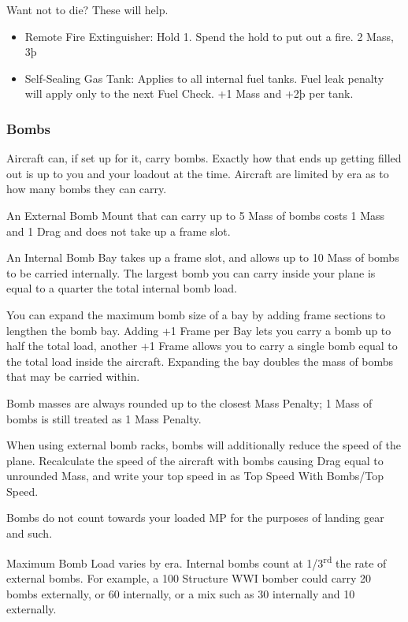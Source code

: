 \documentclass{article}
\begin{document}
Want not to die? These will help.

\begin{itemize}
    \item          Remote Fire Extinguisher: Hold 1. Spend the hold to put out a
          fire. 2 Mass, 3þ
    \item          Self-Sealing Gas Tank: Applies to all internal fuel tanks. Fuel
          leak penalty will apply only to the next Fuel Check. +1 Mass and +2þ
          per tank.
\end{itemize}

\subsubsection{Bombs}
\label{_Bombs}

Aircraft can, if set up for it, carry bombs. Exactly how that ends up
getting filled out is up to you and your loadout at the time. Aircraft
are limited by era as to how many bombs they can carry.

An External Bomb Mount that can carry up to 5 Mass of bombs costs 1 Mass
and 1 Drag and does not take up a frame slot.

An Internal Bomb Bay takes up a frame slot, and allows up to 10 Mass of
bombs to be carried internally. The largest bomb you can carry inside
your plane is equal to a quarter the total internal bomb load.

You can expand the maximum bomb size of a bay by adding frame sections
to lengthen the bomb bay. Adding +1 Frame per Bay lets you carry a bomb
up to half the total load, another +1 Frame allows you to carry a single
bomb equal to the total load inside the aircraft. Expanding the bay
doubles the mass of bombs that may be carried within.

Bomb masses are always rounded up to the closest Mass Penalty; 1 Mass of
bombs is still treated as 1 Mass Penalty.

When using external bomb racks, bombs will additionally reduce the speed
of the plane. Recalculate the speed of the aircraft with bombs causing
Drag equal to unrounded Mass, and write your top speed in as Top Speed
With Bombs/Top Speed.

Bombs do not count towards your loaded MP for the purposes of landing
gear and such.

Maximum Bomb Load varies by era. Internal bombs count at
1/3\textsuperscript{rd} the rate of external bombs. For example, a 100
Structure WWI bomber could carry 20 bombs externally, or 60 internally,
or a mix such as 30 internally and 10 externally.
\end{document}
